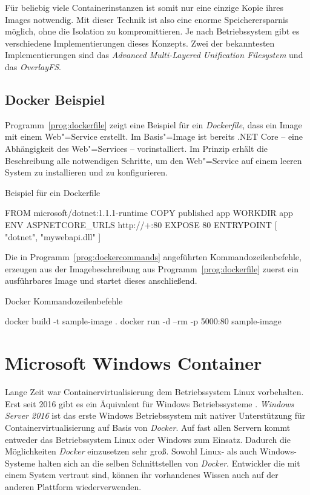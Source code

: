 Für beliebig viele Containerinstanzen ist somit nur eine einzige Kopie ihres Images notwendig. Mit dieser Technik ist also eine enorme Speicherersparnis möglich, ohne die Isolation zu kompromittieren. Je nach Betriebssystem gibt es verschiedene Implementierungen dieses Konzepts. Zwei der bekanntesten Implementierungen sind das \textit{Advanced Multi-Layered Unification File\-system} und das \textit{OverlayFS}.

\subsection{Docker Beispiel}

Programm~\ref{prog:dockerfile} zeigt eine Beispiel für ein \textit{Dockerfile}, dass ein Image mit einem Web"=Service erstellt. Im Basis"=Image ist bereits .NET Core -- eine Abhängigkeit des Web"=Services -- vorinstalliert. Im Prinzip erhält die Beschreibung alle notwendigen Schritte, um den Web"=Service auf einem leeren System zu installieren und zu konfigurieren.

\begin{program}[!hbt]
\caption{Beispiel für ein Dockerfile}
\label{prog:dockerfile}
\begin{DockerCode}
FROM microsoft/dotnet:1.1.1-runtime
COPY published app
WORKDIR app
ENV ASPNETCORE_URLS http://+:80 
EXPOSE 80
ENTRYPOINT [ "dotnet", "mywebapi.dll" ]
\end{DockerCode}
\end{program}

Die in Programm~\ref{prog:dockercommands} angeführten Kommandozeilenbefehle, erzeugen aus der Imagebeschreibung aus Programm~\ref{prog:dockerfile} zuerst ein ausführbares Image und startet dieses anschließend.

\begin{program}[!hbt]
\caption{Docker Kommandozeilenbefehle}
\label{prog:dockercommands}
\begin{GenericCode}
docker build -t sample-image .
docker run -d --rm -p 5000:80 sample-image
\end{GenericCode}
\end{program}

\section{Microsoft Windows Container}

Lange Zeit war Containervirtualisierung dem Betriebssystem Linux vorbehalten. Erst seit 2016 gibt es ein Äquivalent für Windows Betriebssysteme \cite{WinSerCont}. \textit{Windows Server 2016} ist das erste Windows Betriebssystem mit nativer Unterstützung für Containervirtualisierung auf Basis von \textit{Docker}. Auf fast allen Servern kommt entweder das Betriebssystem Linux oder Windows zum Einsatz. Dadurch die Möglichkeiten \textit{Docker} einzusetzen sehr groß. Sowohl Linux- als auch Windows-Systeme halten sich an die selben Schnittstellen von \textit{Docker}. Entwickler die mit einem System vertraut sind, können ihr vorhandenes Wissen auch auf der anderen Plattform wiederverwenden.

